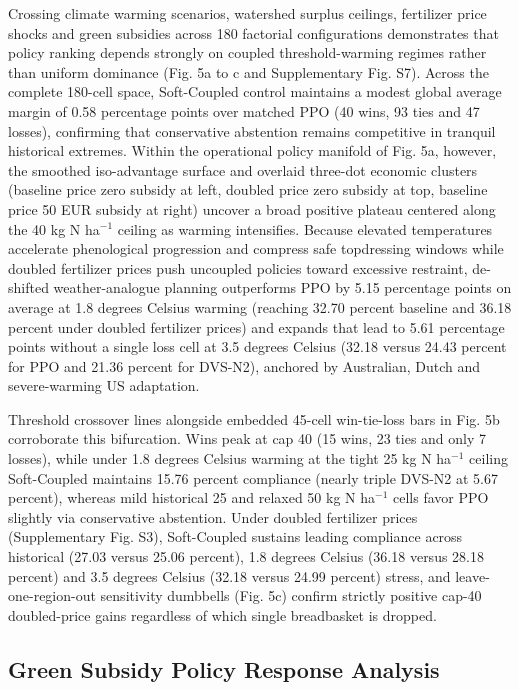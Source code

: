\documentclass[11pt,a4paper]{article}
\begin{document}
Crossing climate warming scenarios, watershed surplus ceilings, fertilizer price shocks and green subsidies across 180 factorial configurations demonstrates that policy ranking depends strongly on coupled threshold-warming regimes rather than uniform dominance (Fig. 5a to c and Supplementary Fig. S7). Across the complete 180-cell space, Soft-Coupled control maintains a modest global average margin of 0.58 percentage points over matched PPO (40 wins, 93 ties and 47 losses), confirming that conservative abstention remains competitive in tranquil historical extremes. Within the operational policy manifold of Fig. 5a, however, the smoothed iso-advantage surface and overlaid three-dot economic clusters (baseline price zero subsidy at left, doubled price zero subsidy at top, baseline price 50 EUR subsidy at right) uncover a broad positive plateau centered along the 40 kg N ha$^{-1}$ ceiling as warming intensifies. Because elevated temperatures accelerate phenological progression and compress safe topdressing windows while doubled fertilizer prices push uncoupled policies toward excessive restraint, de-shifted weather-analogue planning outperforms PPO by 5.15 percentage points on average at 1.8 degrees Celsius warming (reaching 32.70 percent baseline and 36.18 percent under doubled fertilizer prices) and expands that lead to 5.61 percentage points without a single loss cell at 3.5 degrees Celsius (32.18 versus 24.43 percent for PPO and 21.36 percent for DVS-N2), anchored by Australian, Dutch and severe-warming US adaptation.

Threshold crossover lines alongside embedded 45-cell win-tie-loss bars in Fig. 5b corroborate this bifurcation. Wins peak at cap 40 (15 wins, 23 ties and only 7 losses), while under 1.8 degrees Celsius warming at the tight 25 kg N ha$^{-1}$ ceiling Soft-Coupled maintains 15.76 percent compliance (nearly triple DVS-N2 at 5.67 percent), whereas mild historical 25 and relaxed 50 kg N ha$^{-1}$ cells favor PPO slightly via conservative abstention. Under doubled fertilizer prices (Supplementary Fig. S3), Soft-Coupled sustains leading compliance across historical (27.03 versus 25.06 percent), 1.8 degrees Celsius (36.18 versus 28.18 percent) and 3.5 degrees Celsius (32.18 versus 24.99 percent) stress, and leave-one-region-out sensitivity dumbbells (Fig. 5c) confirm strictly positive cap-40 doubled-price gains regardless of which single breadbasket is dropped.

\subsection{Green Subsidy Policy Response Analysis}
\end{document}
